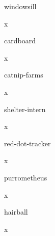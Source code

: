 \documentclass{resume}
\begin{document}
\begin{experience}
  \begin{role}{windowsill}
    \item x
  \end{role}
  \begin{role}{cardboard}
    \item x
  \end{role}
  \begin{role}{catnip-farms}
    \item x
  \end{role}
  \begin{role}{shelter-intern}
    \item x
  \end{role}
\end{experience}
\begin{projects}
  \begin{project}{red-dot-tracker}
    \item x
  \end{project}
  \begin{project}{purrometheus}
    \item x
  \end{project}
  \begin{project}{hairball}
    \item x
  \end{project}
\end{projects}
\education[dissertation]
\end{document}
